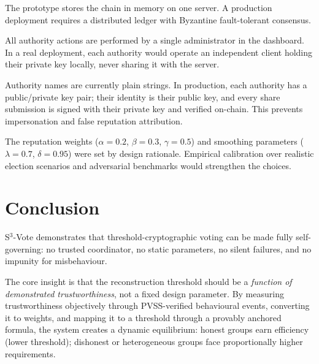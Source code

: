 \documentclass[12pt,a4paper]{article}
\theoremstyle{definition}
\theoremstyle{remark}
\begin{document}
\begin{description}[leftmargin=2em]
  \item[Single-node blockchain.]
    The prototype stores the chain in memory on one server.
    A production deployment requires a distributed ledger with Byzantine
    fault-tolerant consensus.

  \item[Simulated authority clients.]
    All authority actions are performed by a single administrator in the
    dashboard. In a real deployment, each authority would operate an
    independent client holding their private key locally, never sharing it
    with the server.

  \item[Cryptographic identity.]
    Authority names are currently plain strings. In production, each
    authority has a public/private key pair; their identity is their public
    key, and every share submission is signed with their private key and
    verified on-chain. This prevents impersonation and false reputation
    attribution.

  \item[Parameter calibration.]
    The reputation weights ($\alpha{=}0.2$, $\beta{=}0.3$, $\gamma{=}0.5$)
    and smoothing parameters ($\lambda{=}0.7$, $\delta{=}0.95$) were set by
    design rationale. Empirical calibration over realistic election scenarios
    and adversarial benchmarks would strengthen the choices.

\end{description}

\section{Conclusion}
\label{sec:conclusion}

S$^3$-Vote demonstrates that threshold-cryptographic voting can be made
fully self-governing: no trusted coordinator, no static parameters, no
silent failures, and no impunity for misbehaviour.

The core insight is that the reconstruction threshold should be a
\emph{function of demonstrated trustworthiness}, not a fixed design
parameter. By measuring trustworthiness objectively through
PVSS-verified behavioural events, converting it to weights, and
mapping it to a threshold through a provably anchored formula, the system
creates a dynamic equilibrium: honest groups earn efficiency (lower
threshold); dishonest or heterogeneous groups face proportionally higher
requirements.
\end{document}
